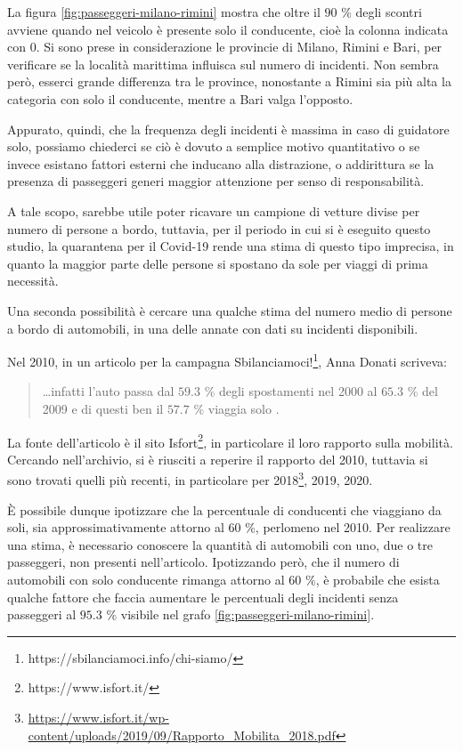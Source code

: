 \documentclass[a4paper,12pt]{report}
\begin{document}
La figura \ref{fig:passeggeri-milano-rimini} mostra che oltre il $90$ \% degli scontri
avviene quando nel veicolo è presente solo il conducente, 
cioè la colonna indicata con 0. 
Si sono prese in considerazione le provincie di Milano, Rimini e Bari, 
per verificare se la località marittima influisca sul numero di incidenti. 
Non sembra però, esserci grande differenza tra le province, nonostante a Rimini sia 
più alta la categoria con solo il conducente, mentre a Bari valga l'opposto. 

Appurato, quindi, che la frequenza degli incidenti è massima in caso di guidatore solo, 
possiamo chiederci se ciò è dovuto a semplice motivo quantitativo o se invece esistano 
fattori esterni che inducano alla distrazione, o addirittura se la presenza 
di passeggeri generi maggior attenzione per senso di responsabilità.

A tale scopo, sarebbe utile poter ricavare un campione di vetture divise per 
numero di persone a bordo, tuttavia, per il periodo in cui si è eseguito questo 
studio, la quarantena per il Covid-19 rende una stima di questo tipo 
imprecisa, in quanto la maggior parte delle persone si spostano da sole 
per viaggi di prima necessità. 

Una seconda possibilità è cercare una qualche stima del numero medio di 
persone a bordo di automobili, in una delle annate con dati su incidenti disponibili. 

Nel 2010, in un articolo per la campagna 
Sbilanciamoci!\footnote{https://sbilanciamoci.info/chi-siamo/}, 
Anna Donati scriveva: 

\begin{quotation}
    \dots infatti l’auto passa dal $59.3$ \% degli spostamenti nel 2000 al $65.3$ \% del 
    2009 e di questi ben il $57.7$ \% viaggia solo \cite{SBILANCIAMOCI:1}. 
\end{quotation}

La fonte dell'articolo è il sito Isfort\footnote{https://www.isfort.it/}, 
in particolare il loro rapporto sulla mobilità. 
Cercando nell'archivio, si è riusciti a reperire il rapporto del 2010, 
tuttavia si sono trovati quelli più recenti, in particolare per 
2018\footnote{\url{https://www.isfort.it/wp-content/uploads/2019/09/Rapporto_Mobilita_2018.pdf}}, 
2019, 2020. 

\`E possibile dunque ipotizzare che la percentuale di conducenti che viaggiano 
da soli, sia approssimativamente attorno al $60$ \%, perlomeno nel 2010. 
Per realizzare una stima, è necessario conoscere la quantità di automobili con uno, 
due o tre passeggeri, non presenti nell'articolo. 
Ipotizzando però, che il numero di automobili con solo conducente rimanga attorno al 
$60$ \%, è probabile che esista qualche fattore che faccia aumentare le percentuali 
degli incidenti senza passeggeri al 
$95.3$ \% visibile nel grafo \ref{fig:passeggeri-milano-rimini}. 
\end{document}
